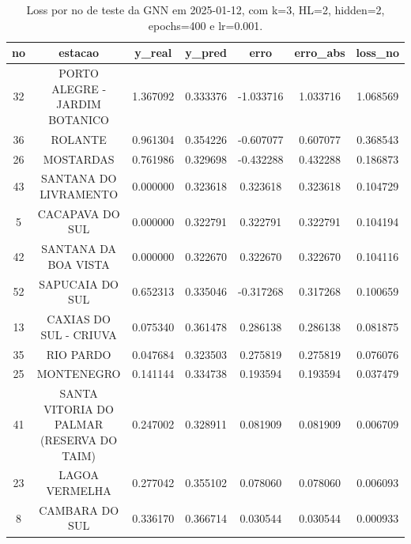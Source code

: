 \begin{table}[h]
\centering
\caption{Loss por no de teste da GNN em 2025-01-12, com k=3, HL=2, hidden=2, epochs=400 e lr=0.001.}
\label{tab:gnn_loss_k3_hl2_h2_e400_d20250112}
\begin{tabular}{ccccccc}
\toprule
no & estacao & y\_real & y\_pred & erro & erro\_abs & loss\_no \\
\midrule
32 & PORTO ALEGRE - JARDIM BOTANICO & 1.367092 & 0.333376 & -1.033716 & 1.033716 & 1.068569 \\
36 & ROLANTE & 0.961304 & 0.354226 & -0.607077 & 0.607077 & 0.368543 \\
26 & MOSTARDAS & 0.761986 & 0.329698 & -0.432288 & 0.432288 & 0.186873 \\
43 & SANTANA DO LIVRAMENTO & 0.000000 & 0.323618 & 0.323618 & 0.323618 & 0.104729 \\
5 & CACAPAVA DO SUL & 0.000000 & 0.322791 & 0.322791 & 0.322791 & 0.104194 \\
42 & SANTANA DA BOA VISTA & 0.000000 & 0.322670 & 0.322670 & 0.322670 & 0.104116 \\
52 & SAPUCAIA DO SUL & 0.652313 & 0.335046 & -0.317268 & 0.317268 & 0.100659 \\
13 & CAXIAS DO SUL - CRIUVA & 0.075340 & 0.361478 & 0.286138 & 0.286138 & 0.081875 \\
35 & RIO PARDO & 0.047684 & 0.323503 & 0.275819 & 0.275819 & 0.076076 \\
25 & MONTENEGRO & 0.141144 & 0.334738 & 0.193594 & 0.193594 & 0.037479 \\
41 & SANTA VITORIA DO PALMAR (RESERVA DO TAIM) & 0.247002 & 0.328911 & 0.081909 & 0.081909 & 0.006709 \\
23 & LAGOA VERMELHA & 0.277042 & 0.355102 & 0.078060 & 0.078060 & 0.006093 \\
8 & CAMBARA DO SUL & 0.336170 & 0.366714 & 0.030544 & 0.030544 & 0.000933 \\
\bottomrule
\end{tabular}
\end{table}
